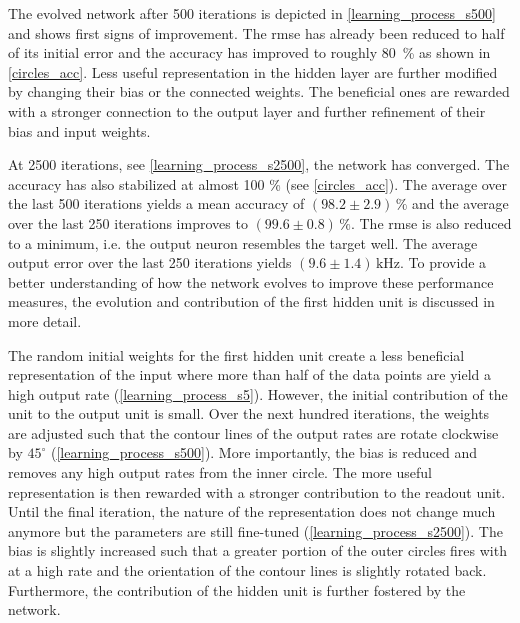 %	

The evolved network after 500 iterations is depicted in \cref{learning_process_s500} and shows first signs of improvement. The \gls{rmse} has already been reduced to half of its initial error and the accuracy has improved to roughly \SI{80}{\%} as shown in \cref{circles_acc}. Less useful representation in the hidden layer are further modified by changing their bias or the connected weights. The beneficial ones are rewarded with a stronger connection to the output layer and further refinement of their bias and input weights.

At 2500 iterations, see \cref{learning_process_s2500}, the network has converged. The accuracy has also stabilized at almost 100 \% (see \cref{circles_acc}). The average over the last 500 iterations yields a mean accuracy of $(98.2 \pm 2.9)\,\%$ and the average over the last 250 iterations improves to  $(99.6 \pm 0.8)\,\%$. The \gls{rmse} is also reduced to a minimum, i.e. the output neuron resembles the target well. The average output error over the last 250 iterations yields $(9.6 \pm 1.4)\,\si{\kilo \Hz}$. To provide a better understanding of how the network evolves to improve these performance measures, the evolution and contribution of the first hidden unit is discussed in more detail.

The random initial weights for the first hidden unit create a less beneficial representation of the input where more than half of the data points are yield a high output rate (\cref{learning_process_s5}). However, the initial contribution of the unit to the output unit is small. Over the next hundred iterations, the weights are adjusted such that the contour lines of the output rates are rotate clockwise by $45^\circ$ (\cref{learning_process_s500}). More importantly, the bias is reduced and removes any high output rates from the inner circle. The more useful representation is then rewarded with a stronger contribution to the readout unit. Until the final iteration, the nature of the representation does not change much anymore but the parameters are still fine-tuned (\cref{learning_process_s2500}). The bias is slightly increased such that a greater portion of the outer circles fires with at a high rate and the orientation of the contour lines is slightly rotated back. Furthermore, the contribution of the hidden unit is further fostered by the network.


%    
